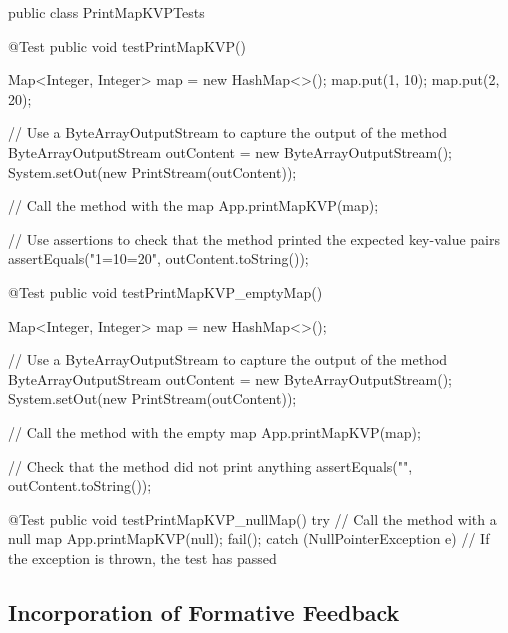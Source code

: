 \documentclass[a4paper]{article}
\begin{document}
    \hspace{-1.7cm}\begin{verbbox}[]
public class PrintMapKVPTests {
  @Test
  public void testPrintMapKVP() {
    Map<Integer, Integer> map = new HashMap<>();
    map.put(1, 10);
    map.put(2, 20);

    // Use a ByteArrayOutputStream to capture the output of the method
    ByteArrayOutputStream outContent = new ByteArrayOutputStream();
    System.setOut(new PrintStream(outContent));

    // Call the method with the map
    App.printMapKVP(map);

    // Use assertions to check that the method printed the expected key-value pairs
    assertEquals("1=10=20\n", outContent.toString());
  }

  @Test
  public void testPrintMapKVP_emptyMap() {
    Map<Integer, Integer> map = new HashMap<>();

    // Use a ByteArrayOutputStream to capture the output of the method
    ByteArrayOutputStream outContent = new ByteArrayOutputStream();
    System.setOut(new PrintStream(outContent));

    // Call the method with the empty map
    App.printMapKVP(map);

    // Check that the method did not print anything
    assertEquals("", outContent.toString());
  }

  @Test
  public void testPrintMapKVP_nullMap() {
    try {
      // Call the method with a null map
      App.printMapKVP(null);
      fail();
    } catch (NullPointerException e) {
      // If the exception is thrown, the test has passed
    }
  }
}
    \end{verbbox}
   \theverbbox









\newpage

























\subsection{Incorporation of Formative Feedback}


\newpage



\end{document}
